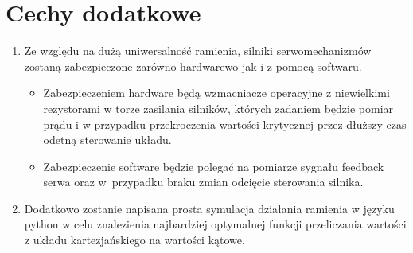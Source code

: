\documentclass[12pt]{article}
\begin{document}
    \section{Cechy dodatkowe}
        \begin{enumerate}
            \item Ze względu na dużą uniwersalność ramienia, silniki serwomechanizmów zostaną zabezpieczone zarówno hardwarewo
            jak i z pomocą softwaru.
            \begin{itemize}
                \item Zabezpieczeniem hardware będą wzmacniacze operacyjne z niewielkimi rezystorami w torze zasilania silników, 
                których zadaniem będzie pomiar prądu i w przypadku przekroczenia wartości krytycznej przez dłuższy czas odetną sterowanie układu.
                \item Zabezpieczenie software będzie polegać na pomiarze sygnału feedback serwa
                oraz w~przypadku braku zmian odcięcie sterowania silnika.
            \end{itemize}
            \item Dodatkowo zostanie napisana prosta symulacja działania ramienia w języku python w celu znalezienia najbardziej optymalnej funkcji przeliczania wartości z układu kartezjańskiego na wartości kątowe.
        \end{enumerate}
\end{document}

